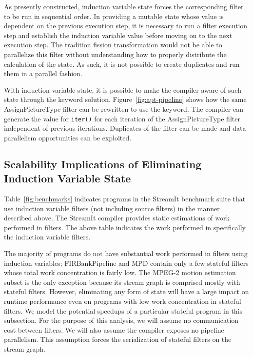 As presently constructed, induction variable state for\-ces the
corresponding filter to be run in sequential order.  In providing a
mutable state whose value is dependent on the previous execution step,
it is necessary to run a filter execution step and establish the
induction variable value before moving on to the next execution step.
The tradition fission transformation would not be able to parallelize
this filter without understanding how to properly distribute the
calculation of the state.  As such, it is not possible 
to create duplicates and run them in a parallel fashion.  

With induction variable state, it is possible to make the 
compiler aware of such state through the keyword solution.  
Figure~\ref{fig:apt-pipeline} shows how the same AssignPictureType filter can be 
rewritten to use the keyword.  The compiler can generate the value
for {\tt iter()} for each iteration of the AssignPictureType filter independent
of previous iterations.  Duplicates of the filter can be made and
data parallelism opportunities can be exploited.


\subsection{Scalability Implications of Eliminating Induction Variable State}
\label{sec:model-analysis}
Table~\ref{fig:benchmarks} indicates programs in the StreamIt benchmark suite that use induction variable filters (not including source filters) in the manner described above.  The StreamIt compiler provides static estimations of work performed in filters.  The above table indicates the work performed in specifically the induction variable filters.

The majority of programs do not have substantial work performed in filters using induction variables; FIRBankPipeline and MPD contain only a few stateful filters whose total work concentration is fairly low.  The MPEG-2 motion estimation subset is the only exception because its stream graph is comprised mostly with stateful filters.  However, eliminating any form of state will have a large impact on runtime performance even on programs with low work concentration in stateful filters.  We model the potential speedups of a particular stateful program in this subsection.  For the purpose of this analysis, we will assume no communication cost between filters.  We will also assume the compiler exposes no pipeline parallelism.  This assumption forces the serialization of stateful filters on the stream graph.

